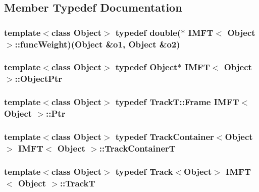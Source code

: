 \subsection{\-Member \-Typedef \-Documentation}
\hypertarget{class_i_m_f_t_ae7436174afe28b7a25237c97b2b9f416}{
\subsubsection[{func\-Weight}]{\setlength{\rightskip}{0pt plus 5cm}template$<$class \-Object$>$ typedef double($\ast$ {\bf \-I\-M\-F\-T}$<$ \-Object $>$\-::{\bf func\-Weight})(\-Object \&o1, \-Object \&o2)}}\label{class_i_m_f_t_ae7436174afe28b7a25237c97b2b9f416}
\hypertarget{class_i_m_f_t_a9f291b28e2caab20361d790d02774dfe}{
\subsubsection[{\-Object\-Ptr}]{\setlength{\rightskip}{0pt plus 5cm}template$<$class \-Object$>$ typedef \-Object$\ast$ {\bf \-I\-M\-F\-T}$<$ \-Object $>$\-::{\bf \-Object\-Ptr}}}\label{class_i_m_f_t_a9f291b28e2caab20361d790d02774dfe}
\hypertarget{class_i_m_f_t_ab9da2d474c63076c3a194d343fc20169}{
\subsubsection[{\-Ptr}]{\setlength{\rightskip}{0pt plus 5cm}template$<$class \-Object$>$ typedef {\bf \-Track\-T\-::\-Frame} {\bf \-I\-M\-F\-T}$<$ \-Object $>$\-::{\bf \-Ptr}}}\label{class_i_m_f_t_ab9da2d474c63076c3a194d343fc20169}
\hypertarget{class_i_m_f_t_a8aad0b1bd309bfb92abb74ce45e549a9}{
\subsubsection[{\-Track\-Container\-T}]{\setlength{\rightskip}{0pt plus 5cm}template$<$class \-Object$>$ typedef {\bf \-Track\-Container}$<$\-Object$>$ {\bf \-I\-M\-F\-T}$<$ \-Object $>$\-::{\bf \-Track\-Container\-T}}}\label{class_i_m_f_t_a8aad0b1bd309bfb92abb74ce45e549a9}
\hypertarget{class_i_m_f_t_a37f74f73fc6d19920930474c5522e242}{
\subsubsection[{\-Track\-T}]{\setlength{\rightskip}{0pt plus 5cm}template$<$class \-Object$>$ typedef {\bf \-Track}$<$\-Object$>$ {\bf \-I\-M\-F\-T}$<$ \-Object $>$\-::{\bf \-Track\-T}}}\label{class_i_m_f_t_a37f74f73fc6d19920930474c5522e242}
